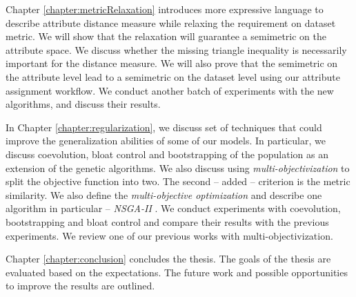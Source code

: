 Chapter \ref{chapter:metricRelaxation} introduces more expressive language to describe attribute distance measure while relaxing the requirement on dataset metric. We will show that the relaxation will guarantee a semimetric on the attribute space. We discuss whether the missing triangle inequality is necessarily important for the distance measure. We will also prove that the semimetric on the attribute level lead to a semimetric on the dataset level using our attribute assignment workflow. We conduct another batch of experiments with the new algorithms, and discuss their results.

In Chapter \ref{chapter:regularization}, we discuss set of techniques that could improve the generalization abilities of some of our models. In particular, we discuss coevolution, bloat control and bootstrapping  of the population as an extension of the genetic algorithms. We also discuss using \emph{multi-objectivization} to split the objective function into two. The second -- added -- criterion is the metric similarity. We also define the \emph{multi-objective optimization} and describe one algorithm in particular -- \emph{NSGA-II} \cite{nsgaII}. We conduct experiments with coevolution, bootstrapping and bloat control and compare their results with the previous experiments. We review one of our previous works  with multi-objectivization.

Chapter \ref{chapter:conclusion} concludes the thesis. The goals of the thesis are evaluated based on the expectations. The future work and possible opportunities to improve the results are outlined.

 

 